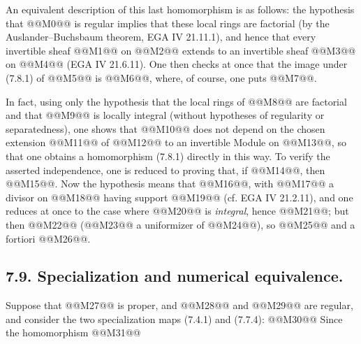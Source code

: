 
An equivalent description of this last homomorphism is as follows: the hypothesis that @@M0@@ is regular implies that these local rings are factorial (by the Auslander--Buchsbaum theorem, EGA IV 21.11.1), and hence that every invertible sheaf @@M1@@ on @@M2@@ extends to an invertible sheaf @@M3@@ on @@M4@@ (EGA IV 21.6.11). One then checks at once that the image under (7.8.1) of @@M5@@ is @@M6@@, where, of course, one puts @@M7@@.

In fact, using only the hypothesis that the local rings of @@M8@@ are factorial and that @@M9@@ is locally integral (without hypotheses of regularity or separatedness), one shows that @@M10@@ does not depend on the chosen extension @@M11@@ of @@M12@@ to an invertible Module on @@M13@@, so that one obtains a homomorphism (7.8.1) directly in this way. To verify the asserted independence, one is reduced to proving that, if @@M14@@, then @@M15@@. Now the hypothesis means that @@M16@@, with @@M17@@ a divisor on @@M18@@ having support @@M19@@ (cf. EGA IV 21.2.11), and one reduces at once to the case where @@M20@@ is \emph{integral}, hence @@M21@@; but then @@M22@@ (@@M23@@ a uniformizer of @@M24@@), so @@M25@@ and a fortiori @@M26@@.

\subsection*{7.9. Specialization and numerical equivalence.}
Suppose that @@M27@@ is proper, and @@M28@@ and @@M29@@ are regular, and consider the two specialization maps (7.4.1) and (7.7.4):
@@M30@@
Since the homomorphism
@@M31@@
